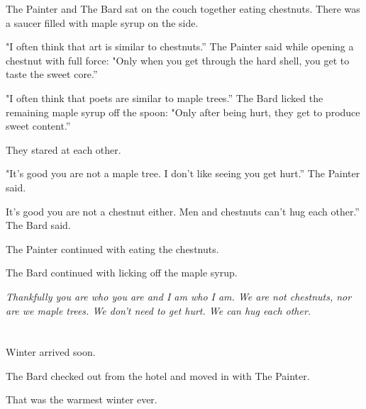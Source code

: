 \documentclass{article}
\begin{document}
The Painter and The Bard sat on the couch together eating chestnuts. There was a saucer filled with maple syrup on the side.

"I often think that art is similar to chestnuts.” The Painter said while opening a chestnut with full force: "Only when you get through the hard shell, you get to taste the sweet core.”

"I often think that poets are similar to maple trees.” The Bard licked the remaining maple syrup off the spoon: "Only after being hurt, they get to produce sweet content.”

They stared at each other.

"It's good you are not a maple tree. I don't like seeing you get hurt.” The Painter said.

It's good you are not a chestnut either. Men and chestnuts can't hug each other.” The Bard said.

The Painter continued with eating the chestnuts.

The Bard continued with licking off the maple syrup.

\textit{
Thankfully you are who you are and I am who I am. We are not chestnuts, nor are we maple trees.
We don't need to get hurt. We can hug each other.}

\section{} %
\par Winter arrived soon.
\par The Bard checked out from the hotel and moved in with The Painter.
\par That was the warmest winter ever.
\end{document}
